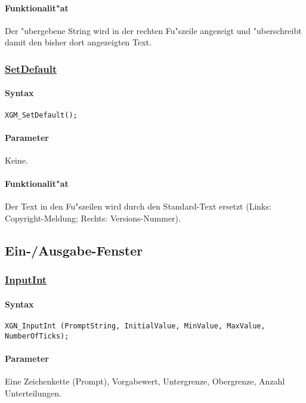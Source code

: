 \paragraph{Funktionalit"at}
Der "ubergebene String wird in der rechten Fu"szeile angezeigt und
"uberschreibt damit den bisher dort angezeigten Text.


\subsubsection{\underline{SetDefault}}

\paragraph{Syntax}
\begin{verbatim}
XGM_SetDefault();
\end{verbatim}

\paragraph{Parameter}
Keine.

\paragraph{Funktionalit"at}
Der Text in den Fu"szeilen wird durch den Standard-Text ersetzt
(Links: Copyright-Meldung; Rechts: Versions-Nummer).




\subsection{Ein-/Ausgabe-Fenster\label{XGN}}


\subsubsection{\underline{InputInt}}

\paragraph{Syntax}
\begin{verbatim}
XGN_InputInt (PromptString, InitialValue, MinValue, MaxValue, NumberOfTicks);
\end{verbatim}

\paragraph{Parameter}
Eine Zeichenkette (Prompt), Vorgabewert, Untergrenze, Obergrenze, Anzahl Unterteilungen.


